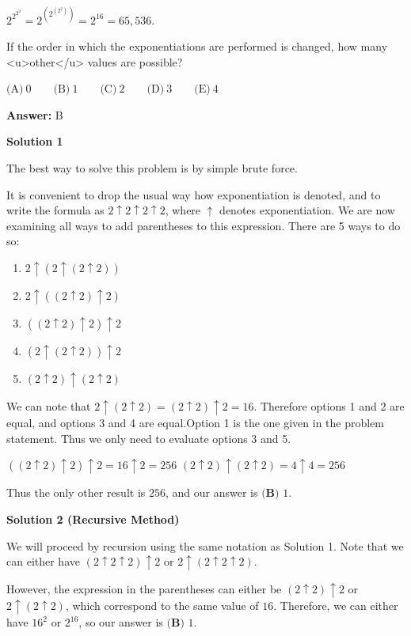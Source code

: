 \begin{enumerate}
 $2^{2^{2^2}} = 2^{\left(2^{\left(2^2\right)}\right)} = 2^{16} = 65,536$.


 If the order in which the exponentiations are performed is changed, how many <u>other</u> values are possible?


 

$\text{(A)}\ 0 \qquad \text{(B)}\ 1 \qquad \text{(C)}\ 2 \qquad \text{(D)}\ 3 \qquad \text{(E)}\ 4$

 \textbf{Answer: }B



\textbf{Solution 1}

The best way to solve this problem is by simple brute force. 

 It is convenient to drop the usual way how exponentiation is denoted, and to write the formula as $2\uparrow 2\uparrow 2\uparrow 2$, where $\uparrow$ denotes exponentiation. We are now examining all ways to add parentheses to this expression. There are 5 ways to do so:

 
            \begin{enumerate}
        \item $2\uparrow (2\uparrow (2\uparrow 2))$
        \item $2\uparrow ((2\uparrow 2)\uparrow 2)$
        \item $((2\uparrow 2)\uparrow 2)\uparrow 2$
        \item $(2\uparrow (2\uparrow 2))\uparrow 2$
        \item $(2\uparrow 2)\uparrow (2\uparrow 2)$
            \end{enumerate}
            We can note that $2\uparrow (2\uparrow 2) = (2\uparrow 2)\uparrow 2 =16$. Therefore options 1 and 2 are equal, and options 3 and 4 are equal.Option 1 is the one given in the problem statement. Thus we only need to evaluate options 3 and 5.

 $((2\uparrow 2)\uparrow 2)\uparrow 2 = 16\uparrow 2 = 256$
$(2\uparrow 2)\uparrow (2\uparrow 2) = 4 \uparrow 4 = 256$

 Thus the only other result is $256$, and our answer is $\boxed{\textbf{(B) } 1}$.

 



\textbf{Solution 2 (Recursive Method)}

We will proceed by recursion using the same notation as Solution 1. Note that we can either have $(2 \uparrow 2 \uparrow 2) \uparrow 2$ or $2 \uparrow (2 \uparrow 2 \uparrow 2)$.

 However, the expression in the parentheses can either be $(2 \uparrow 2) \uparrow 2$ or $2 \uparrow (2 \uparrow 2)$, which correspond to the same value of $16$. Therefore, we can either have $16^2$ or $2^{16}$, so our answer is $\boxed{\textbf{(B) }1}$.


\end{enumerate}
